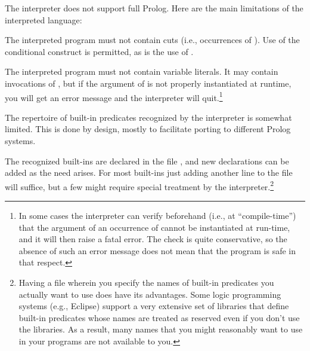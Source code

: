 



The interpreter does not support full Prolog.  Here are the main limitations
of the interpreted language:
\begin{Enumerate}

\item
  The interpreted program must not contain cuts (i.e., occurrences
  of ).  Use of the conditional
  construct is permitted, as is the use of
  .

\item
  The interpreted program must not contain variable literals.  It may contain invocations of , but if the
  argument of  is not properly instantiated at runtime, you will
  get an error message and the interpreter will quit.\footnote{
    In some cases the interpreter can verify beforehand (i.e., at
    ``compile-time'') that the argument of an occurrence of 
    cannot be instantiated at run-time, and it will then raise a fatal error.
    The check is quite conservative, so the absence of such an error message
    does not mean that the program is safe in that respect.}

\item
  The repertoire of built-in predicates recognized
  by the interpreter is somewhat limited.  This is done by design, mostly to
  facilitate porting to different Prolog systems.

  The recognized built-ins are declared in the file ,
  and new declarations can be added as the need arises.  For most built-ins
  just adding another line to the file will suffice, but a few might
  require special treatment by the interpreter.\footnote{
    Having a file wherein you specify the names of built-in predicates you
    actually want to use does have its advantages.  Some logic programming
    systems (e.g., Eclipse) support a very extensive set of libraries that
    define built-in predicates whose names are treated as reserved even if
    you don't use the libraries.  As a result, many names that you might
    reasonably want to use in your programs are not available to you.}
\end{Enumerate}

